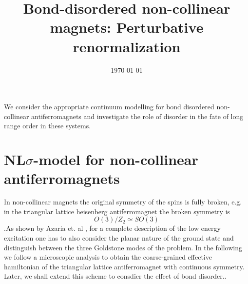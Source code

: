 \documentclass[notitlepage,onecolumn,showpacs,11pt]{revtex4-1}
\begin{document}
\title{Bond-disordered non-collinear magnets: Perturbative renormalization}

\date{\today}

\maketitle

We consider the appropriate continuum modelling for bond disordered
non-collinear antiferromagnets and investigate the role of disorder in
the fate of long range order in these systems.


\section{NL$\sigma$-model for non-collinear antiferromagnets}


In non-collinear magnets the original symmetry of the spins is fully broken, 
e.g. in the triangular lattice heisenberg antiferromagnet the broken symmetry 
is 
\begin{equation}
    O(3)/Z_2\simeq SO(3)
\end{equation}
.As shown by Azaria et. al \cite{azaria-93}, for a complete description of the 
low energy excitation one has to also consider the planar nature of the ground 
state and distinguish between the three Goldstone modes of the problem. In the 
following we follow a microscopic analysis \cite{dombre-88} to obtain the 
coarse-grained effective hamiltonian of the triangular lattice antiferromagnet 
with continuous symmetry. Later, we shall extend this scheme to consdier the 
effect of bond disorder.. 
\end{document}
